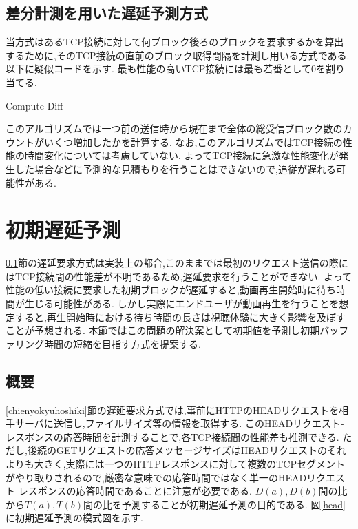 \documentclass[a4j,12pt]{gradthesis_utf8}
\begin{document}
\subsection{差分計測を用いた遅延予測方式}
\label{diff}
当方式はあるTCP接続に対して何ブロック後ろのブロックを要求するかを算出するために,そのTCP接続の直前のブロック取得間隔を計測し用いる方式である.
以下に疑似コードを示す.
最も性能の高いTCP接続には最も若番として0を割り当てる.

\begin{algorithm}
	\caption{Compute Diff}
	\begin{algorithmic}[1]
		\Else 
		\EndIf
	\end{algorithmic}
\end{algorithm}

このアルゴリズムでは一つ前の送信時から現在まで全体の総受信ブロック数のカウントがいくつ増加したかを計算する.
なお,このアルゴリズムではTCP接続の性能の時間変化については考慮していない.
よってTCP接続に急激な性能変化が発生した場合などに予測的な見積もりを行うことはできないので,追従が遅れる可能性がある.

\newpage

\section{初期遅延予測}
\label{shoki}
\ref{diff}節の遅延要求方式は実装上の都合,このままでは最初のリクエスト送信の際にはTCP接続間の性能差が不明であるため,遅延要求を行うことができない.
よって性能の低い接続に要求した初期ブロックが遅延すると,動画再生開始時に待ち時間が生じる可能性がある.
しかし実際にエンドユーザが動画再生を行うことを想定すると,再生開始時における待ち時間の長さは視聴体験に大きく影響を及ぼすことが予想される.
本節ではこの問題の解決案として初期値を予測し初期バッファリング時間の短縮を目指す方式を提案する.

\subsection{概要}
\label{shokigaiyo}
\ref{chienyokyuhoshiki}節の遅延要求方式では,事前にHTTPのHEADリクエストを相手サーバに送信し,ファイルサイズ等の情報を取得する.
このHEADリクエスト-レスポンスの応答時間を計測することで,各TCP接続間の性能差も推測できる.
ただし,後続のGETリクエストの応答メッセージサイズはHEADリクエストのそれよりも大きく,実際には一つのHTTPレスポンスに対して複数のTCPセグメントがやり取りされるので,厳密な意味での応答時間ではなく単一のHEADリクエスト-レスポンスの応答時間であることに注意が必要である.
\begin{math}D(a), D(b)\end{math}間の比から\begin{math}T(a), T(b)\end{math}間の比を予測することが初期遅延予測の目的である.
図\ref{head}に初期遅延予測の模式図を示す.
\end{document}
